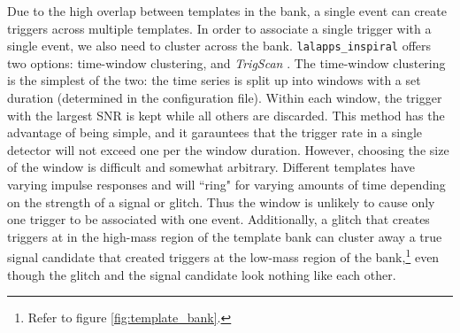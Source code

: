 Due to the high overlap between templates in the bank, a single event can
create triggers across multiple templates. In order to associate a single
trigger with a single event, we also need to cluster across the bank.
\texttt{lalapps\_inspiral} offers two options: time-window clustering, and
\emph{TrigScan} \cite{SenguptaTrigScan}. The time-window clustering is the
simplest of the two: the time series is split up into windows with a set
duration (determined in the configuration file). Within each window, the
trigger with the largest \ac{SNR} is kept while all others are discarded. This
method has the advantage of being simple, and it garauntees that the trigger
rate in a single detector will not exceed one per the window duration. However,
choosing the size of the window is difficult and somewhat arbitrary. Different
templates have varying impulse responses and will ``ring" for varying amounts
of time depending on the strength of a signal or glitch. Thus the window is
unlikely to cause only one trigger to be associated with one event.
Additionally, a glitch that creates triggers at in the high-mass region of the
template bank can cluster away a true signal candidate that created triggers at
the low-mass region of the bank,\footnote{Refer to figure
\ref{fig:template_bank}.} even though the glitch and the signal candidate look
nothing like each other.

